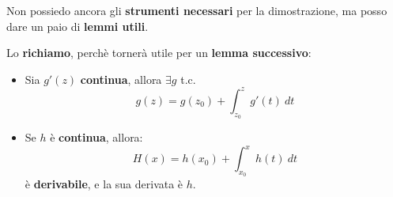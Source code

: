 \documentclass[a4paper, oneside]{article}
\begin{document}
    \noindent Non possiedo ancora gli \textbf{strumenti necessari} per la dimostrazione, ma posso dare un paio di \textbf{lemmi utili}.

    \begin{lemma}
        Lo \textbf{richiamo}, perchè tornerà utile per un \textbf{lemma successivo}:
        \begin{itemize}
            \item Sia $g'(z)$ \textbf{continua}, allora $\exists g$ t.c.
            \[g(z) = g(z_0) + \int_{z_0}^{z} g'(t) \ dt\]
            \item Se $h$ è \textbf{continua}, allora:
            \[H(x) = h(x_0) + \int_{x_0}^{x} h(t)\ dt\]
            è \textbf{derivabile}, e la sua derivata è $h$.
        \end{itemize}
    \end{lemma}
\end{document}
